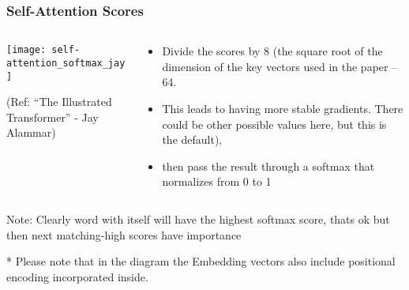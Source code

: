\begin{frame}[fragile]\frametitle{Self-Attention Scores}

\begin{columns}
    \begin{column}[T]{0.5\linewidth}
\begin{center}
\texttt{[image: self-attention\_softmax\_jay]}


{\tiny (Ref: ``The Illustrated Transformer'' - Jay Alammar)}
\end{center}		

		\end{column}
    \begin{column}[T]{0.5\linewidth}

\begin{itemize}
\item Divide the scores by 8 (the square root of the dimension of the key vectors used in the paper – 64. 
\item This leads to having more stable gradients. There could be other possible values here, but this is the default), 
\item then pass the result through a softmax that normalizes from 0 to 1

\end{itemize}
    \end{column}
  \end{columns}
  
   Note: Clearly word with itself will have the highest softmax score, thats ok
 but then next matching-high scores have importance

* Please note that in the diagram the Embedding vectors also include positional encoding incorporated inside.
\end{frame}

